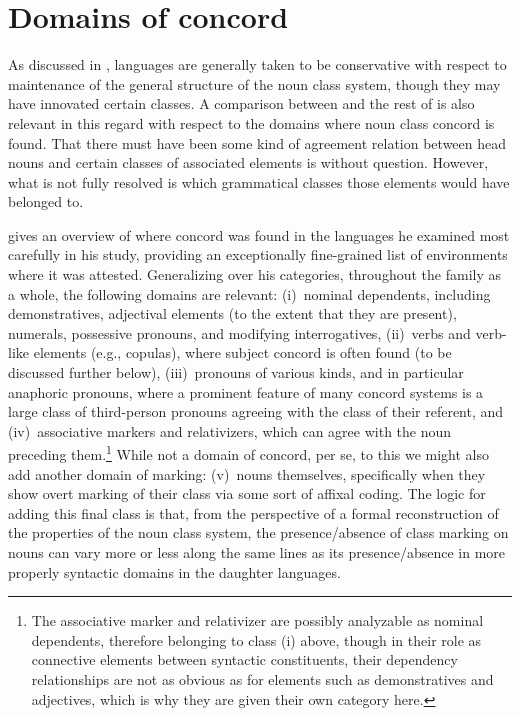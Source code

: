 \documentclass[output=paper ,collection	  ,collectionchapter ,biblatexbackend=biber   ]{langscibook}
\begin{document}
\section{Domains of concord \label{Concord}}\label{sec:good:4}
\largerpage[-2]
As discussed in ,  languages are generally taken to be
conservative with respect to maintenance of the general structure of the
 noun class system, though they may have innovated certain
classes. A comparison between  and the rest of  is also
relevant in this regard with respect to the domains where noun class concord is
found. That there must have been some kind of agreement relation between head
nouns and certain classes of associated elements is without question. However, what is
not fully resolved is which grammatical classes those elements would have
belonged to.

\citet[182--185]{deWolf1971} gives an overview of where concord was found in
the languages he examined most carefully in his study, providing an
exceptionally fine-grained list of environments where it was attested.
Generalizing over his categories, throughout the family as a whole, the
following domains are relevant: (i)~nominal dependents, including
demonstratives, adjectival elements (to the extent that they are present),
numerals, possessive pronouns, and modifying interrogatives, (ii)~verbs and
verb-like elements (e.g., copulas), where subject concord is often found (to be
discussed further below), (iii)~pronouns of various kinds, and in particular
anaphoric pronouns, where a prominent feature of many 
concord systems is a large class of third-person pronouns agreeing with the
class of their referent, and (iv)~associative markers and relativizers, which
can agree with the noun preceding them.{\footnote{The associative marker and
relativizer are possibly analyzable as nominal dependents, therefore belonging
to class (i) above, though in their role as connective elements between
syntactic constituents, their dependency relationships are not as obvious as for
elements such as demonstratives and adjectives, which is why they are given
their own category here.}} While not a domain of concord, per se, to this we
might also add another domain of marking: (v)~nouns themselves, specifically
when they show overt marking of their class via some sort of affixal coding. The
logic for adding this final class is that, from the perspective of a formal
reconstruction of the properties of the  noun class system,
the presence/absence of class marking on nouns can vary more or less along the
same lines as its presence/absence in more properly syntactic domains in the
daughter languages.
\end{document}
